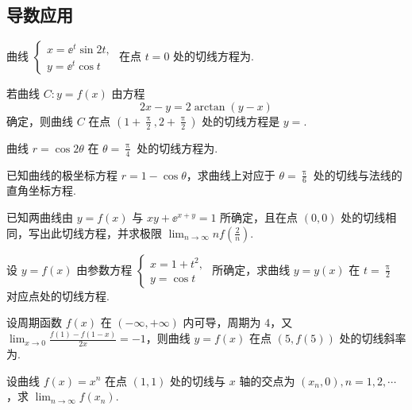 \subsection{导数应用}

	\begin{ti}
		曲线 $\begin{cases}
			x = \ee^{t} \sin 2t,\\
			y = \ee^{t} \cos t
		\end{cases}$ 在点 $t = 0$ 处的切线方程为\htwo.
	\end{ti}

	\begin{ti}
		若曲线 $C: y = f(x)$ 由方程
		\[
			2x - y = 2\arctan(y - x)
		\]
		确定，则曲线 $C$ 在点 $\left( 1 + \frac{\uppi}{2}, 2 + \frac{\uppi}{2} \right)$ 处的切线方程是 $y = $\htwo.
	\end{ti}

	\begin{ti}
		曲线 $r = \cos 2 \theta$ 在 $\theta = \frac{\uppi}{4}$ 处的切线方程为\htwo.
	\end{ti}

	\begin{ti}
		已知曲线的极坐标方程 $r = 1 - \cos \theta$，求曲线上对应于 $\theta = \frac{\uppi}{6}$ 处的切线与法线的直角坐标方程.
	\end{ti}

	\begin{ti}
		已知两曲线由 $y = f(x)$ 与 $xy + \ee^{x + y} = 1$ 所确定，且在点 $(0,0)$ 处的切线相同，写出此切线方程，并求极限 $\lim_{n \to \infty} n f\left( \frac{2}{n} \right)$.
	\end{ti}

	\begin{ti}
		设 $y = f(x)$ 由参数方程 $\begin{cases}
			x = 1 + t^{2},\\
			y = \cos t
		\end{cases}$ 所确定，求曲线 $y = y(x)$ 在 $t = \frac{\uppi}{2}$ 对应点处的切线方程.
	\end{ti}

	\begin{ti}
		设周期函数 $f(x)$ 在 $(-\infty,+\infty)$ 内可导，周期为 $4$，又 $\lim_{x \to 0} \frac{f(1) - f(1 - x)}{2x} = -1$，则曲线 $y = f(x)$ 在点 $(5,f(5))$ 处的切线斜率为\kuo.
		
		\fourch{$\frac{1}{2}$}{$0$}{$-1$}{$-2$}
	\end{ti}

	\begin{ti}
		设曲线 $f(x) = x^{n}$ 在点 $(1,1)$ 处的切线与 $x$ 轴的交点为 $(x_{n},0),n = 1,2,\cdots$，求 $\lim_{n \to \infty} f(x_{n})$.
	\end{ti}

